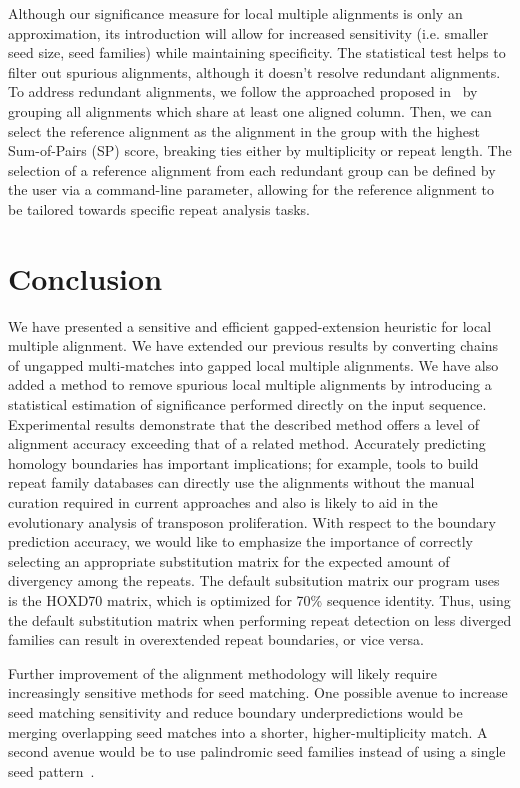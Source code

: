\documentclass[10pt,journal,letterpaper,compsoc,peerreview]{IEEEtran}
\begin{document}
Although our significance measure for local multiple alignments is only an approximation, its introduction will allow
for increased sensitivity (i.e. smaller seed size, seed families) while maintaining specificity. The statistical
test helps to filter out spurious alignments, although it doesn't resolve redundant alignments. To address redundant alignments, we follow
the approached proposed in~\cite{ref-related1} by grouping all alignments which share at least one aligned column. Then, we can select the reference alignment
as the alignment in the group with the highest Sum-of-Pairs (SP) score, breaking ties either by multiplicity or repeat length. The selection of a reference alignment from each redundant group can be defined by the user via a command-line parameter, allowing for the reference alignment to be tailored towards specific repeat analysis tasks.



\section{Conclusion}
We have presented a sensitive and efficient gapped-extension heuristic for local
multiple alignment. We have extended our previous results by
converting chains of ungapped multi-matches into gapped local multiple
alignments. We have also added a method to remove spurious local multiple alignments by introducing a statistical estimation of significance
performed directly on the input sequence.  Experimental results demonstrate that the
described method offers a level of alignment accuracy exceeding
that of a related method. Accurately predicting homology boundaries has important implications; for example, tools to build repeat family databases can directly use the alignments without the manual curation required in current approaches and also is likely to aid in the evolutionary analysis of transposon proliferation.  With respect to the boundary prediction accuracy, we would like to emphasize the importance of correctly selecting an appropriate substitution matrix for the expected amount of divergency among the repeats. The default subsitution matrix our program uses is the HOXD70 matrix, which is optimized for 70\% sequence identity. Thus, using the default substitution matrix when performing repeat detection on less diverged families can result in overextended repeat boundaries, or vice versa.

Further improvement of the alignment methodology will likely require increasingly sensitive methods for
seed matching. One possible avenue to increase seed matching sensitivity and reduce boundary underpredictions would be merging overlapping seed matches into a
shorter, higher-multiplicity match.  A second avenue would be to use palindromic seed families instead of using a single seed pattern~\cite{ref-pattern}.
\end{document}
